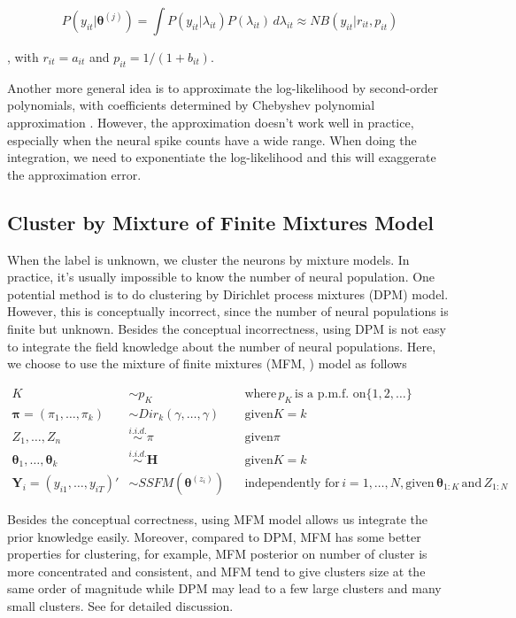 \documentclass{article}
\begin{document}
	$$
	P(y_{it}|\bm{\theta}^{(j)}) = \int P(y_{it}|\lambda_{it})P(\lambda_{it})\,d\lambda_{it}\approx NB(y_{it}|r_{it}, p_{it})
	$$
	
	, with $r_{it} = a_{it}$ and $p_{it} = 1/(1 + b_{it})$.
	
	Another more general idea is to approximate the log-likelihood by second-order polynomials, with coefficients determined by Chebyshev polynomial approximation \citet{Keeley2019}. However, the approximation doesn’t work well in practice, especially when the neural spike counts have a wide range. When doing the integration, we need to exponentiate the log-likelihood and this will exaggerate the approximation error.
	
	\subsection{Cluster by Mixture of Finite Mixtures Model}
	When the label is unknown, we cluster the neurons by mixture models. In practice, it’s usually impossible to know the number of neural population. One potential method is to do clustering by Dirichlet process mixtures (DPM) model. However, this is conceptually incorrect, since the number of neural populations is finite but unknown. Besides the conceptual incorrectness, using DPM is not easy to integrate the field knowledge about the number of neural populations. Here, we choose to use the mixture of finite mixtures (MFM, \citet{Miller2018}) model as follows
	
	\begin{align*}
		K &\sim p_K &&\text{where}\, p_K \, \text{is a p.m.f. on} \{1,2,\ldots\}\\
		\bm{\pi}=(\pi_1,\ldots,\pi_k) &\sim Dir_k(\gamma, \ldots,\gamma) &&\text{given} K=k\\
		Z_1,\ldots,Z_n&\stackrel{i.i.d.}{\sim}\pi &&\text{given} \pi\\
		\bm{\theta}_1,\ldots,\bm{\theta}_k&\stackrel{i.i.d.}{\sim}\bm{H} &&\text{given} K=k\\
		\bm{Y}_i = (y_{i1},\ldots,y_{iT})' &\sim SSFM(\bm{\theta}^{(z_i)}) &&\text{independently for}\, i=1,\ldots,N, \text{given}\, \bm{\theta}_{1:K}\, \text{and}\, Z_{1:N}
	\end{align*}
	
	Besides the conceptual correctness, using MFM model allows us integrate the prior knowledge easily. Moreover, compared to DPM, MFM has some better properties for clustering, for example, MFM posterior on number of cluster is more concentrated and consistent, and MFM tend to give clusters size at the same order of magnitude while DPM may lead to a few large clusters and many small clusters. See \cite{Miller2018} for detailed discussion. 
	
\end{document}

